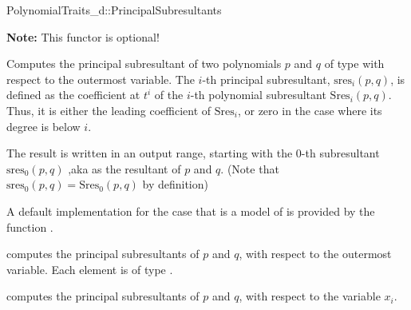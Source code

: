 \begin{ccRefConcept}{PolynomialTraits_d::PrincipalSubresultants}

\textbf{Note:} This functor is optional!

\ccDefinition

Computes the principal subresultant of two polynomials $p$ and $q$ of 
type  
with respect to the outermost variable.
The $i$-th principal subresultant, $\mathrm{sres}_i(p,q)$,
is defined as the coefficient at $t^i$ of the $i$-th polynomial
subresultant $\mathrm{Sres}_i(p,q)$. Thus, it is either the leading
coefficient of $\mathrm{Sres}_i$, or zero in the case where its degree is 
below $i$.

The result is written in an output range, starting with the $0$-th subresultant
$\mathrm{sres}_0(p,q)$
,aka as the resultant of $p$ and $q$.
(Note that $\mathrm{sres}_0(p,q)=\mathrm{Sres}_0(p,q)$ by definition)

A default implementation for the case that 
is a model of 
is provided by the function .


\ccOperations
{}
         { computes the principal subresultants of $p$ and $q$, 
           with respect to the outermost variable. Each element is of type
           .}

         { computes the principal subresultants of $p$ and $q$, 
           with respect to the variable $x_i$.}


\ccSeeAlso

\\
\\
\\

\end{ccRefConcept}
